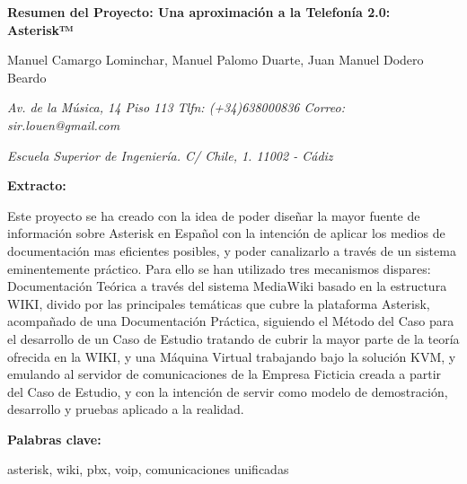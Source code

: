 
\begin{center}
\Large \textbf{Resumen del Proyecto: Una aproximación a la Telefonía 2.0: Asterisk™}\\

\vspace*{1cm}

\large Manuel Camargo Lominchar, Manuel Palomo Duarte, Juan Manuel Dodero Beardo

\vspace*{0.6cm}

\normalsize \textit{Av. de la Música, 14 Piso 113 Tlfn: (+34)638000836 Correo: sir.louen@gmail.com}

\normalsize \textit{Escuela Superior de Ingeniería. C/ Chile, 1. 11002 -
  Cádiz}
\small

\vspace*{1cm}

\begin{minipage}{14cm}
\textbf{Extracto:}

Este proyecto se ha creado con la idea de poder diseñar la mayor fuente de información sobre Asterisk en Español con la intención de aplicar los medios de documentación mas eficientes posibles, y poder canalizarlo a través de un sistema eminentemente práctico. Para ello se han utilizado tres mecanismos dispares: Documentación Teórica a través del sistema MediaWiki basado en la estructura WIKI, divido por las principales temáticas que cubre la plataforma Asterisk, acompañado de una Documentación Práctica, siguiendo el Método del Caso para el desarrollo de un Caso de Estudio tratando de cubrir la mayor parte de la teoría ofrecida en la WIKI, y una Máquina Virtual trabajando bajo la solución KVM, y emulando al servidor de comunicaciones de la Empresa Ficticia creada a partir del Caso de Estudio, y con la intención de servir como modelo de demostración, desarrollo y pruebas aplicado a la realidad. 

\vspace*{0.6cm}

\textbf{Palabras clave:}

asterisk, wiki, pbx, voip, comunicaciones unificadas
\end{minipage}
\normalsize
\end{center}


\indiceArt